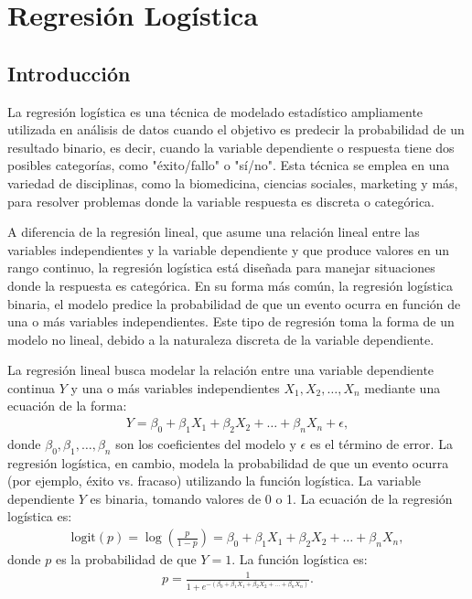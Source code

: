 \documentclass[a4paper]{report} %
\begin{document}
\chapter{Regresi\'on Log\'istica}


\section{Introducci\'on}


La regresi\'on log\'istica es una t\'ecnica de modelado estad\'istico ampliamente utilizada en an\'alisis de datos cuando el objetivo es predecir la probabilidad de un resultado binario, es decir, cuando la variable dependiente o respuesta tiene dos posibles categor\'ias, como "\'exito/fallo" o "s\'i/no". Esta t\'ecnica se emplea en una variedad de disciplinas, como la biomedicina, ciencias sociales, marketing y m\'as, para resolver problemas donde la variable respuesta es discreta o categ\'orica.\medskip

A diferencia de la regresi\'on lineal, que asume una relaci\'on lineal entre las variables independientes y la variable dependiente y que produce valores en un rango continuo, la regresi\'on log\'istica est\'a dise\~nada para manejar situaciones donde la respuesta es categ\'orica. En su forma m\'as com\'un, la regresi\'on log\'istica binaria, el modelo predice la probabilidad de que un evento ocurra en funci\'on de una o m\'as variables independientes. Este tipo de regresi\'on toma la forma de un modelo no lineal, debido a la naturaleza discreta de la variable dependiente.\medskip


La regresi\'on lineal busca modelar la relaci\'on entre una variable dependiente continua $Y$ y una o m\'as variables independientes $X_1, X_2, \ldots, X_n$ mediante una ecuaci\'on de la forma:
\begin{eqnarray}
Y = \beta_0 + \beta_1 X_1 + \beta_2 X_2 + \ldots + \beta_n X_n + \epsilon,
\end{eqnarray}
donde $\beta_0, \beta_1, \ldots, \beta_n$ son los coeficientes del modelo y $\epsilon$ es el t\'ermino de error. La regresi\'on log\'istica, en cambio, modela la probabilidad de que un evento ocurra (por ejemplo, \'exito vs. fracaso) utilizando la funci\'on log\'istica. La variable dependiente $Y$ es binaria, tomando valores de 0 o 1. La ecuaci\'on de la regresi\'on log\'istica es:
\begin{eqnarray}
\text{logit}(p) = \log\left(\frac{p}{1-p}\right) = \beta_0 + \beta_1 X_1 + \beta_2 X_2 + \ldots + \beta_n X_n,
\end{eqnarray}
donde $p$ es la probabilidad de que $Y=1$. La funci\'on log\'istica es:
\begin{eqnarray}
p = \frac{1}{1 + e^{-(\beta_0 + \beta_1 X_1 + \beta_2 X_2 + \ldots + \beta_n X_n)}}.
\end{eqnarray}
\end{document}
